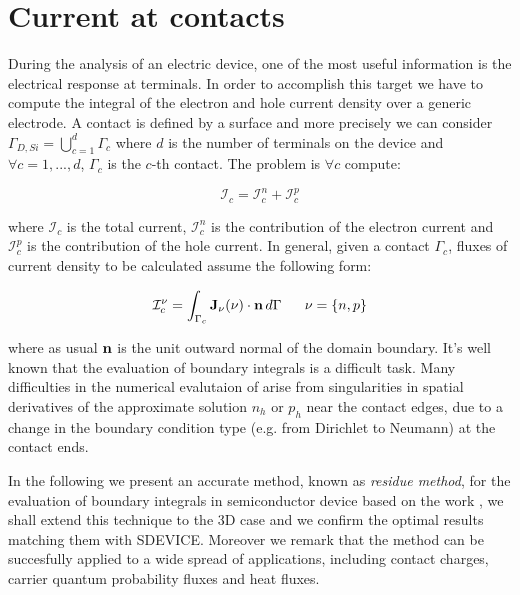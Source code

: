 \clearpage


\section{Current at contacts}

During the analysis of an electric device, one of the most useful information is the electrical response at terminals. In order to accomplish this target we have to compute the integral of the electron and hole current density over a generic electrode. A contact is defined by a surface and more precisely we can consider $\Gamma_{D,Si} = \bigcup_{c=1}^d \Gamma_c$ where $d$ is the number of terminals on the device and $\forall c=1,...,d$, $\Gamma_c$ is the $c$-th contact. The problem is $\forall c$ compute:

\begin{equation}
\mathcal{I}_c = \mathcal{I}_c^n + \mathcal{I}_c^p
\end{equation}

where $\mathcal{I}_c$ is the total current, $\mathcal{I}_c^n$ is the contribution of the electron current and $\mathcal{I}_c^p$ is the contribution of the hole current.
In general, given a contact $\Gamma_c$, fluxes of current density to be calculated assume the following form:

\begin{equation}
\label{eq: current flux}
\mathcal{I}_c^\nu = \int_{\Gamma_c}\vect{J}_\nu(\nu) \cdot \vect{n} \, d{\Gamma} \psp{10} \nu = \{n,p\}
\end{equation}

where as usual $\mathbf{n}$ is the unit outward normal of the domain boundary. It's well known that the evaluation of boundary integrals is a difficult task. Many difficulties in the numerical evalutaion of  arise from singularities in spatial derivatives of the approximate solution $n_h$ or $p_h$ near the contact edges, due to a change in the boundary condition type (e.g. from Dirichlet to Neumann) at the contact ends.

In the following we present an accurate method, known as \textit{residue method}, for the evaluation of boundary integrals in semiconductor device based on the work \cite{ContactCurrentRM}, we shall extend this technique to the 3D case and we confirm the optimal results matching them with SDEVICE. Moreover we remark that the method can be succesfully applied to a wide spread of applications, including contact charges, carrier quantum probability fluxes and heat fluxes.

